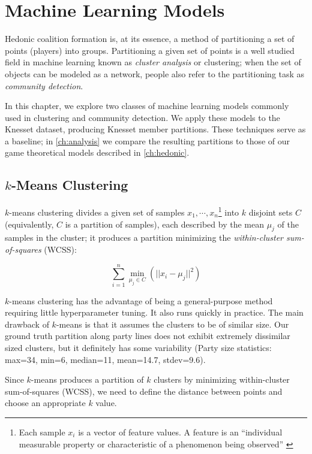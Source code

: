 
\chapter{Machine Learning Models}
\label{ch:comparison}
Hedonic coalition formation is, at its essence, a method of partitioning a set
of points (players) into groups.
Partitioning a given set of points is a well studied field in machine learning
known as {\em cluster analysis} or clustering;
when the set of objects can be modeled as a network, people also refer to the
partitioning task as {\em community detection}.

In this chapter, we explore two classes of machine learning models commonly used
in clustering and community detection.
We apply these models to the Knesset dataset, producing Knesset member partitions.
These techniques serve as a baseline;
in \autoref{ch:analysis} we compare the resulting partitions to those of our game
theoretical models described in \autoref{ch:hedonic}.


\section{$k$-Means Clustering}
\label{sec:k_means_clustering}

$k$-means clustering\cite{Tan:2018:IDM:3208440} divides a given set of samples
$x_1, \cdots, x_n$\footnote{Each sample $x_i$ is a vector of feature values.
A feature is an ``individual measurable property or characteristic of a
phenomenon being observed'' \cite{Bishop:2006:PRM:1162264}} into $k$ disjoint
sets $C$ (equivalently, $C$ is a partition of samples), each described by the
mean $\mu_j$ of the samples in the cluster;
it produces a partition minimizing the {\em within-cluster sum-of-squares} (WCSS):

\[
    \sum_{i=1}^{n} \underset{\mu_j \in C}{\min}(||x_i - \mu_j||^2)
\]

$k$-means clustering has the advantage of being a general-purpose method
requiring little hyperparameter tuning.
It also runs quickly in practice.
The main drawback of $k$-means is that it assumes the clusters to be of similar
size.
Our ground truth partition along party lines does not exhibit extremely
dissimilar sized clusters, but it definitely has some variability (Party size
statistics: max=34, min=6, median=11, mean=14.7, stdev=9.6).

Since $k$-means produces a partition of $k$ clusters by minimizing within-cluster
sum-of-squares (WCSS), we need to define the distance between points and choose
an appropriate $k$ value.

